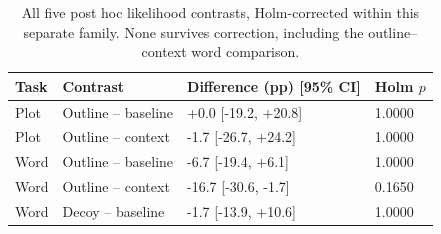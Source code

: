 \begin{table}[htbp]
\centering\small
\begin{tabular}{@{}llll@{}}
\toprule
Task & Contrast & Difference (pp) [95\% CI] & Holm $p$ \\
\midrule
Plot & Outline -- baseline & +0.0 [-19.2, +20.8] & 1.0000 \\
Plot & Outline -- context & -1.7 [-26.7, +24.2] & 1.0000 \\
Word & Outline -- baseline & -6.7 [-19.4, +6.1] & 1.0000 \\
Word & Outline -- context & -16.7 [-30.6, -1.7] & 0.1650 \\
Word & Decoy -- baseline & -1.7 [-13.9, +10.6] & 1.0000 \\
\bottomrule
\end{tabular}
\caption{All five post hoc likelihood contrasts, Holm-corrected within this separate family. None survives correction, including the outline--context word comparison.}
\label{tab:likelihood-contrasts}
\end{table}
